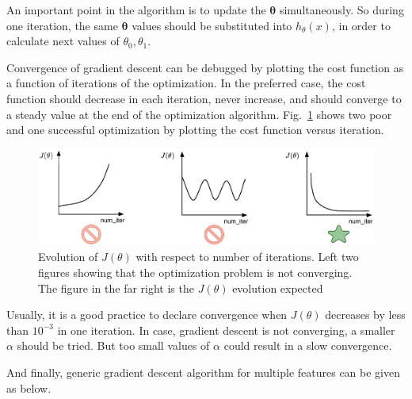 An important point in the algorithm is to update the $\bm{\theta}$ simultaneously. 
So during one iteration, the same $\bm{\theta}$ values should be substituted into $h_\theta(x)$, in order to calculate next values of $\theta_0, \theta_1$.
 
Convergence of gradient descent can be debugged by plotting the cost function as a function of iterations of the optimization.
In the preferred case, the cost function should decrease in each iteration, never increase, and should converge to a steady value at the end of the optimization algorithm. 
Fig.~\ref{fig:visualizeCostFunc} shows two poor and one successful optimization by plotting the cost function versus iteration. 

\begin{figure}[hbt]
\begin{center}
\includegraphics[width=15cm]{figures/visualizeCostFunc}    %
\caption{Evolution of $J(\theta)$ with respect to number of iterations. Left two figures showing that the optimization problem is not converging. The figure in the far right is the $J(\theta)$ evolution expected} 
\label{fig:visualizeCostFunc}
\end{center}
\end{figure}

Usually, it is a good practice to declare convergence when $J(\theta)$ decreases by less than $10^{-3}$ in one iteration. 
In case, gradient descent is not converging, a smaller $\alpha$ should be tried. 
But too small values of $\alpha$ could result in a slow convergence. 

And finally, generic gradient descent algorithm for multiple features can be given as below.

